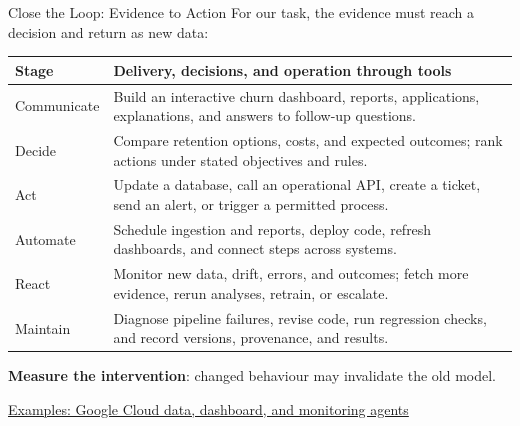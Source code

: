 \documentclass[aspectratio=169]{beamer}
\begin{document}
\begin{frame}{Close the Loop: Evidence to Action}
  \small
  For our task, the evidence must reach a decision and return as new data:
  \vspace{0.1em}
  {\fontsize{9}{10.2}\selectfont\renewcommand{\arraystretch}{1.1}
  \begin{tabular}{@{}>{\raggedright\arraybackslash}p{2.3cm}>{\raggedright\arraybackslash}p{10.1cm}@{}}
    \toprule
    \textbf{Stage} & \textbf{Delivery, decisions, and operation through tools} \\
    \midrule
    Communicate & Build an interactive churn dashboard, reports, applications, explanations, and answers to follow-up questions. \\
    Decide & Compare retention options, costs, and expected outcomes; rank actions under stated objectives and rules. \\
    Act & Update a database, call an operational API, create a ticket, send an alert, or trigger a permitted process. \\
    Automate & Schedule ingestion and reports, deploy code, refresh dashboards, and connect steps across systems. \\
    React & Monitor new data, drift, errors, and outcomes; fetch more evidence, rerun analyses, retrain, or escalate. \\
    Maintain & Diagnose pipeline failures, revise code, run regression checks, and record versions, provenance, and results. \\
    \bottomrule
  \end{tabular}}\par
  \vspace{0.1em}
  \textbf{Measure the intervention}: changed behaviour may invalidate the old model.
  \par\vspace{0.1em}
  {\scriptsize\href{https://cloud.google.com/blog/products/data-analytics/new-data-agents-across-the-agentic-data-cloud/}{Examples: Google Cloud data, dashboard, and monitoring agents}}
\end{frame}
\end{document}
